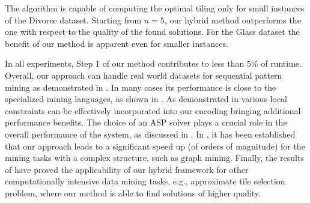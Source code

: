 The  algorithm is capable of computing the optimal tiling only for small instances of the Divorce dataset. Starting from $n=5$, our hybrid method outperforms the  one with respect to the quality of the found solutions. For the Glass dataset the benefit of our method is apparent even for smaller instances.

  

 In all experiments, Step 1 of our method contributes to less than 5\% of runtime. %
Overall, our approach can handle real world datasets for sequential pattern mining as demonstrated in \qone. In many cases %
its performance is %
close to the specialized mining languages, as %
shown in \qtwo. As demonstrated in \qthree various local constraints can be effectively incorporated into our encoding
bringing additional performance benefits. The choice of an ASP solver plays a crucial role in the overall performance of the system, as discussed in \qfour. In \qfive, it has been established that our approach leads to a significant speed up (of orders of magnitude) for the mining tasks with a complex structure, such as graph mining. Finally, the results of \qsix have proved the applicability of our hybrid framework for other computationally intensive data mining tasks, e.g., approximate tile selection problem, where our method is able to find solutions of higher quality.





